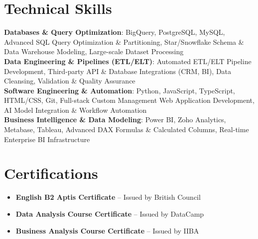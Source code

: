 \documentclass[letterpaper,11pt]{article}
\newcommand{\resumeItem}[1]{
  \item\small{
    {#1 \vspace{1pt}}
  }
}
\newcommand{\resumeItemListStart}{\begin{itemize}[leftmargin=0.15in, itemsep=2.5pt, topsep=2pt, parsep=1.5pt]}
\newcommand{\resumeItemListEnd}{\end{itemize}\vspace{2pt}}
\begin{document}
\section*{Technical Skills}
 \begin{itemize}[leftmargin=0.15in, label={}]
    \small{\item{
     \textbf{Databases \& Query Optimization}: {BigQuery, PostgreSQL, MySQL, Advanced SQL Query Optimization \& Partitioning, Star/Snowflake Schema \& Data Warehouse Modeling, Large-scale Dataset Processing} \\ \vspace{2pt}
     \textbf{Data Engineering \& Pipelines (ETL/ELT)}: {Automated ETL/ELT Pipeline Development, Third-party API \& Database Integrations (CRM, BI), Data Cleansing, Validation \& Quality Assurance} \\ \vspace{2pt}
     \textbf{Software Engineering \& Automation}: {Python, JavaScript, TypeScript, HTML/CSS, Git, Full-stack Custom Management Web Application Development, AI Model Integration \& Workflow Automation} \\ \vspace{2pt}
     \textbf{Business Intelligence \& Data Modeling}: {Power BI, Zoho Analytics, Metabase, Tableau, Advanced DAX Formulas \& Calculated Columns, Real-time Enterprise BI Infrastructure}
    }}
 \end{itemize}

\section*{Certifications}
        \resumeItemListStart
      \resumeItem{\textbf{English B2 Aptis Certificate} -- Issued by British Council}
      \resumeItem{\textbf{Data Analysis Course Certificate} -- Issued by DataCamp}
      \resumeItem{\textbf{Business Analysis Course Certificate} -- Issued by IIBA}
      \resumeItemListEnd

\end{document}
